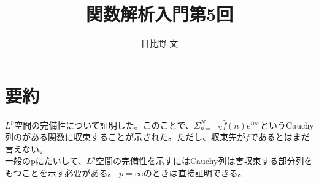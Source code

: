 \documentclass[12pt,a4paper]{ltjsarticle}
\begin{document}
\title{関数解析入門第5回}
\author{日比野 文}
\maketitle

\section{要約}
$L^p$空間の完備性について証明した。このことで、$\Sigma^N_{n=-N}\hat{f}(n)e^{inx}$というCauchy列のがある関数に収束することが示された。ただし、収束先が$f$であるとはまだ言えない。\\
一般のpにたいして、$L^p$空間の完備性を示すにはCauchy列は害収束する部分列をもつことを示す必要がある。
$p=\infty$のときは直接証明できる。\\
\end{document}
